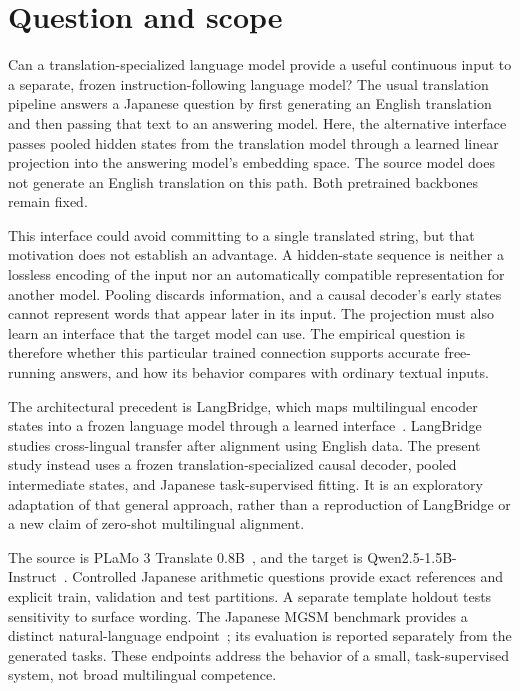 \section{Question and scope}

Can a translation-specialized language model provide a useful continuous input to a separate, frozen instruction-following language model?
The usual translation pipeline answers a Japanese question by first generating an English translation and then passing that text to an answering model.
Here, the alternative interface passes pooled hidden states from the translation model through a learned linear projection into the answering model's embedding space.
The source model does not generate an English translation on this path.
Both pretrained backbones remain fixed.

This interface could avoid committing to a single translated string, but that motivation does not establish an advantage.
A hidden-state sequence is neither a lossless encoding of the input nor an automatically compatible representation for another model.
Pooling discards information, and a causal decoder's early states cannot represent words that appear later in its input.
The projection must also learn an interface that the target model can use.
The empirical question is therefore whether this particular trained connection supports accurate free-running answers, and how its behavior compares with ordinary textual inputs.

The architectural precedent is LangBridge, which maps multilingual encoder states into a frozen language model through a learned interface~\citep{yoon2024langbridge}.
LangBridge studies cross-lingual transfer after alignment using English data.
The present study instead uses a frozen translation-specialized causal decoder, pooled intermediate states, and Japanese task-supervised fitting.
It is an exploratory adaptation of that general approach, rather than a reproduction of LangBridge or a new claim of zero-shot multilingual alignment.

The source is PLaMo 3 Translate 0.8B~\citep{pfn2026plamo}, and the target is Qwen2.5-1.5B-Instruct~\citep{qwen2024model,qwen2024report}.
Controlled Japanese arithmetic questions provide exact references and explicit train, validation and test partitions.
A separate template holdout tests sensitivity to surface wording.
The Japanese MGSM benchmark provides a distinct natural-language endpoint~\citep{shi2022mgsm}; its evaluation is reported separately from the generated tasks.
These endpoints address the behavior of a small, task-supervised system, not broad multilingual competence.

